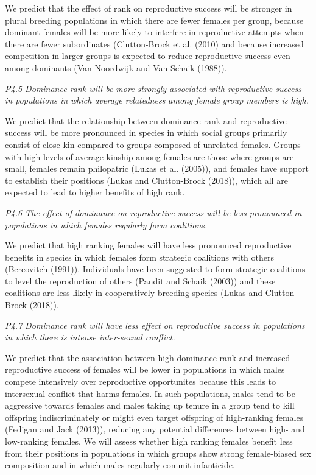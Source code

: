 \documentclass[]{article}
\begin{document}
We predict that the effect of rank on reproductive success will be
stronger in plural breeding populations in which there are fewer females
per group, because dominant females will be more likely to interfere in
reproductive attempts when there are fewer subordinates (Clutton-Brock
et al. (2010) and because increased competition in larger groups is
expected to reduce reproductive success even among dominants (Van
Noordwijk and Van Schaik (1988)).

\emph{P4.5 Dominance rank will be more strongly associated with
reproductive success in populations in which average relatedness among
female group members is high.}

We predict that the relationship between dominance rank and reproductive
success will be more pronounced in species in which social groups
primarily consist of close kin compared to groups composed of unrelated
females. Groups with high levels of average kinship among females are
those where groups are small, females remain philopatric (Lukas et al.
(2005)), and females have support to establish their positions (Lukas
and Clutton-Brock (2018)), which all are expected to lead to higher
benefits of high rank.

\emph{P4.6 The effect of dominance on reproductive success will be less
pronounced in populations in which females regularly form coalitions.}

We predict that high ranking females will have less pronounced
reproductive benefits in species in which females form strategic
coalitions with others (Bercovitch (1991)). Individuals have been
suggested to form strategic coalitions to level the reproduction of
others (Pandit and Schaik (2003)) and these coalitions are less likely
in cooperatively breeding species (Lukas and Clutton-Brock (2018)).

\emph{P4.7 Dominance rank will have less effect on reproductive success
in populations in which there is intense inter-sexual conflict.}

We predict that the association between high dominance rank and
increased reproductive success of females will be lower in populations
in which males compete intensively over reproductive opportunites
because this leads to intersexual conflict that harms females. In such
populations, males tend to be aggressive towards females and males
taking up tenure in a group tend to kill offspring indiscriminately or
might even target offspring of high-ranking females (Fedigan and Jack
(2013)), reducing any potential differences between high- and
low-ranking females. We will assess whether high ranking females benefit
less from their positions in populations in which groups show strong
female-biased sex composition and in which males regularly commit
infanticide.
\end{document}
